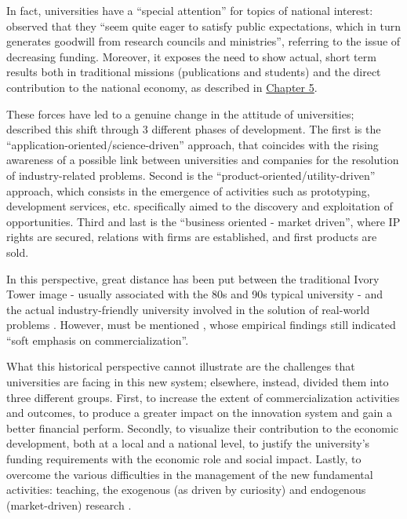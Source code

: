 In fact, universities have a \enquote{special attention} for topics of national interest: \citet{Rasmussen2006} observed that they \enquote{seem quite eager to satisfy public expectations, which in turn generates goodwill from research councils and ministries}, referring to the issue of decreasing funding. Moreover, it exposes the need to show actual, short term results both in traditional missions (publications and students) and the direct contribution to the national economy, as described in \hyperref[Chapter5]{Chapter 5}.

These forces have led to a genuine change in the attitude of universities; \citet{Tijssen2006} described this shift through 3 different phases of development. The first is the \enquote{application-oriented/science-driven} approach, that coincides with the rising awareness of a possible link between universities and companies for the resolution of industry-related problems. Second is the \enquote{product-oriented/utility-driven} approach, which consists in the emergence of activities such as prototyping, development services, etc. specifically aimed to the discovery and exploitation of opportunities. Third and last is the \enquote{business oriented - market driven}, where IP rights are secured, relations with firms are established, and first products are sold.

In this perspective, great distance has been put between the traditional Ivory Tower image - usually associated with the 80s and 90s typical university - and the actual industry-friendly university involved in the solution of real-world problems \citep{Baldini2006}. However, must be mentioned \citet{Rasmussen2006}, whose empirical findings still indicated \enquote{soft emphasis on commercialization}.

What this historical perspective cannot illustrate are the challenges that universities are facing in this new system; elsewhere, instead, \citet{Rasmussen2006} divided them into three different groups. First, to increase the extent of commercialization activities and outcomes, to produce a greater impact on the innovation system and gain a better financial perform. Secondly, to visualize their contribution to the economic development, both at a local and a national level, to justify the university's funding requirements with the economic role and social impact. Lastly, to overcome the various difficulties in the management of the new fundamental activities: teaching, the exogenous (as driven by curiosity) and endogenous (market-driven) research \citep{Debackere2005}. 

